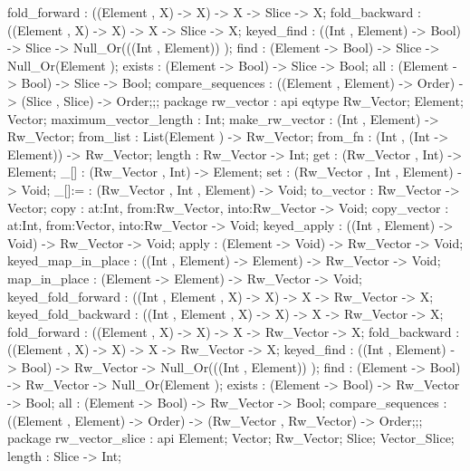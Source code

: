 {{                fold_forward : ((Element , X) -> X) -> X -> Slice -> X;
                fold_backward : ((Element , X) -> X) -> X -> Slice -> X;
                keyed_find : ((Int , Element) -> Bool) -> Slice -> Null_Or(((Int , Element)) );
                find : (Element -> Bool) -> Slice -> Null_Or(Element );
                exists : (Element -> Bool) -> Slice -> Bool;
                all : (Element -> Bool) -> Slice -> Bool;
                compare_sequences : ((Element , Element) -> Order) -> (Slice , Slice) -> Order;};;
        package rw_vector
          : api {
                eqtype Rw_Vector;
                Element;
                Vector;
                maximum_vector_length : Int;
                make_rw_vector : (Int , Element) -> Rw_Vector;
                from_list : List(Element ) -> Rw_Vector;
                from_fn : (Int , (Int -> Element)) -> Rw_Vector;
                length : Rw_Vector -> Int;
                get : (Rw_Vector , Int) -> Element;
                _[] : (Rw_Vector , Int) -> Element;
                set : (Rw_Vector , Int , Element) -> Void;
                _[]:= : (Rw_Vector , Int , Element) -> Void;
                to_vector : Rw_Vector -> Vector;
                copy : {at:Int, from:Rw_Vector, into:Rw_Vector} -> Void;
                copy_vector : {at:Int, from:Vector, into:Rw_Vector} -> Void;
                keyed_apply : ((Int , Element) -> Void) -> Rw_Vector -> Void;
                apply : (Element -> Void) -> Rw_Vector -> Void;
                keyed_map_in_place : ((Int , Element) -> Element) -> Rw_Vector -> Void;
                map_in_place : (Element -> Element) -> Rw_Vector -> Void;
                keyed_fold_forward : ((Int , Element , X) -> X) -> X -> Rw_Vector -> X;
                keyed_fold_backward : ((Int , Element , X) -> X) -> X -> Rw_Vector -> X;
                fold_forward : ((Element , X) -> X) -> X -> Rw_Vector -> X;
                fold_backward : ((Element , X) -> X) -> X -> Rw_Vector -> X;
                keyed_find : ((Int , Element) -> Bool) -> Rw_Vector -> Null_Or(((Int , Element)) );
                find : (Element -> Bool) -> Rw_Vector -> Null_Or(Element );
                exists : (Element -> Bool) -> Rw_Vector -> Bool;
                all : (Element -> Bool) -> Rw_Vector -> Bool;
                compare_sequences : ((Element , Element) -> Order) -> (Rw_Vector , Rw_Vector) -> Order;};;
        package rw_vector_slice
          : api {
                Element;
                Vector;
                Rw_Vector;
                Slice;
                Vector_Slice;
                length : Slice -> Int;
}}

